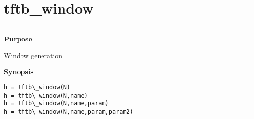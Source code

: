 

\section*{\hspace*{-1.6cm} tftb\_window}

\vspace*{-.4cm}
\hspace*{-1.6cm}\rule[0in]{16.5cm}{.02cm}
\vspace*{.2cm}

{\bf \large \sf Purpose}\\
\hspace*{1.5cm}
\begin{minipage}[t]{13.5cm}
Window generation.
\end{minipage}
\vspace*{.5cm}

{\bf \large \sf Synopsis}\\
\hspace*{1.5cm}
\begin{minipage}[t]{13.5cm}
\begin{verbatim}
h = tftb\_window(N)
h = tftb\_window(N,name)
h = tftb\_window(N,name,param)
h = tftb\_window(N,name,param,param2)
\end{verbatim}
\end{minipage}
\vspace*{.5cm}

